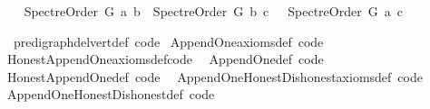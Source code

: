 \begin{isabellebody}
\ \ \isamarkupfalse%
\ {\isachardoublequoteopen}Spectre{\isacharunderscore}{\kern0pt}Order\ {\isacharquery}{\kern0pt}G\ {\isacharquery}{\kern0pt}a\ {\isacharquery}{\kern0pt}b\ {\isasymand}\ Spectre{\isacharunderscore}{\kern0pt}Order\ {\isacharquery}{\kern0pt}G\ {\isacharquery}{\kern0pt}b\ {\isacharquery}{\kern0pt}c\ {\isasymand}\ {\isasymnot}\ Spectre{\isacharunderscore}{\kern0pt}Order\ {\isacharquery}{\kern0pt}G\ {\isacharquery}{\kern0pt}a\ {\isacharquery}{\kern0pt}c{\isachardoublequoteclose}%
\begin{isamarkuptext}%
%
\end{isamarkuptext}\isamarkuptrue%
%
\endisatagproof
{\isafoldproof}%
%
\isadelimproof
%
\endisadelimproof
{}\isamarkupfalse%
%
\isadelimdocument
%
\endisadelimdocument
%
\isatagdocument
%
\isamarkuptrue%
%
\endisatagdocument
{\isafolddocument}%
%
\isadelimdocument
%
\endisadelimdocument
{}\isamarkupfalse%
\ \ pre{\isacharunderscore}{\kern0pt}digraph{\isachardot}{\kern0pt}del{\isacharunderscore}{\kern0pt}vert{\isacharunderscore}{\kern0pt}def\ {\isacharbrackleft}{\kern0pt}code{\isacharbrackright}{\kern0pt}\isanewline
{}\isamarkupfalse%
\ Append{\isacharunderscore}{\kern0pt}One{\isacharunderscore}{\kern0pt}axioms{\isacharunderscore}{\kern0pt}def\ {\isacharbrackleft}{\kern0pt}code{\isacharbrackright}{\kern0pt}\ \isanewline
{}\isamarkupfalse%
\ Honest{\isacharunderscore}{\kern0pt}Append{\isacharunderscore}{\kern0pt}One{\isacharunderscore}{\kern0pt}axioms{\isacharunderscore}{\kern0pt}def{\isacharbrackleft}{\kern0pt}code{\isacharbrackright}{\kern0pt}\ \isanewline
{}\isamarkupfalse%
\ Append{\isacharunderscore}{\kern0pt}One{\isacharunderscore}{\kern0pt}def\ {\isacharbrackleft}{\kern0pt}code{\isacharbrackright}{\kern0pt}\ \isanewline
{}\isamarkupfalse%
\ Honest{\isacharunderscore}{\kern0pt}Append{\isacharunderscore}{\kern0pt}One{\isacharunderscore}{\kern0pt}def\ {\isacharbrackleft}{\kern0pt}code{\isacharbrackright}{\kern0pt}\ \isanewline
{}\isamarkupfalse%
\ Append{\isacharunderscore}{\kern0pt}One{\isacharunderscore}{\kern0pt}Honest{\isacharunderscore}{\kern0pt}Dishonest{\isacharunderscore}{\kern0pt}axioms{\isacharunderscore}{\kern0pt}def\ {\isacharbrackleft}{\kern0pt}code{\isacharbrackright}{\kern0pt}\isanewline
{}\isamarkupfalse%
\ Append{\isacharunderscore}{\kern0pt}One{\isacharunderscore}{\kern0pt}Honest{\isacharunderscore}{\kern0pt}Dishonest{\isacharunderscore}{\kern0pt}def\ {\isacharbrackleft}{\kern0pt}code{\isacharbrackright}{\kern0pt}%

\end{isabellebody}
